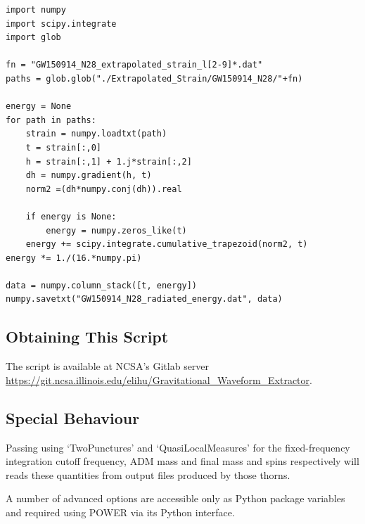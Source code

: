 \begin{verbatim}
import numpy
import scipy.integrate
import glob

fn = "GW150914_N28_extrapolated_strain_l[2-9]*.dat"
paths = glob.glob("./Extrapolated_Strain/GW150914_N28/"+fn)

energy = None
for path in paths:
    strain = numpy.loadtxt(path)
    t = strain[:,0]
    h = strain[:,1] + 1.j*strain[:,2]
    dh = numpy.gradient(h, t)
    norm2 =(dh*numpy.conj(dh)).real
    
    if energy is None:
        energy = numpy.zeros_like(t)
    energy += scipy.integrate.cumulative_trapezoid(norm2, t)
energy *= 1./(16.*numpy.pi)

data = numpy.column_stack([t, energy])
numpy.savetxt("GW150914_N28_radiated_energy.dat", data)
\end{verbatim}

\subsection{Obtaining This Script}

The script is available at NCSA's Gitlab server
\url{https://git.ncsa.illinois.edu/elihu/Gravitational_Waveform_Extractor}.

\subsection{Special Behaviour}

Passing using `TwoPunctures' and `QuasiLocalMeasures' for the fixed-frequency
integration cutoff frequency, ADM mass and final mass and spins respectively
will reads these quantities from output files produced by those thorns.

A number of advanced options are accessible only as Python package variables
and required using POWER via its Python interface.

